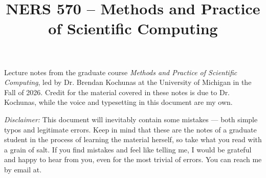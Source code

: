 \documentclass[a4paper,12pt]{article}
\title{NERS 570 -- Methods and Practice of Scientific Computing\vspace{-3em}}
\date{}
\begin{document}

    \maketitle

    Lecture notes from the graduate course \textit{Methods and Practice of Scientific Computing}, led by Dr. Brendan Kochunas at the University of Michigan in the Fall of 2026. Credit for the material covered in these notes is due to Dr. Kochunas, while the voice and typesetting in this document are my own.

    \textit{Disclaimer:} This document will inevitably contain some mistakes --- both simple typos and legitimate errors. Keep in mind that these are the notes of a graduate student in the process of learning the material herself, so take what you read with a grain of salt. If you find mistakes and feel like telling me, I would be grateful and happy to hear from you, even for the most trivial of errors. You can reach me by email at.

    \restoregeometry
    \newpage

    \tableofcontents
    
    
\end{document}
